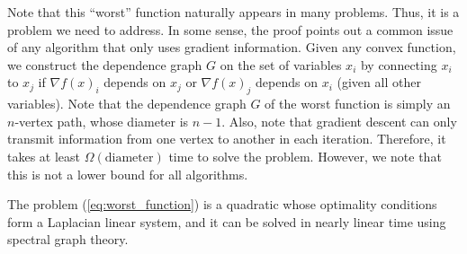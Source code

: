 Note that this ``worst'' function naturally appears in many problems.
Thus, it is a problem we need to address. In some sense, the proof
points out a common issue of any algorithm that only uses gradient
information. Given any convex function, we construct the dependence
graph $G$ on the set of variables $x_{i}$ by connecting $x_{i}$
to $x_{j}$ if $\nabla f(x)_{i}$ depends on $x_{j}$ or $\nabla f(x)_{j}$
depends on $x_{i}$ (given all other variables). Note that the dependence
graph $G$ of the worst function is simply an $n$-vertex path, whose
diameter is $n-1$. Also, note that gradient descent can only transmit
information from one vertex to another in each iteration. Therefore,
it takes at least $\Omega(\mathrm{diameter})$ time to solve the problem.
However, we note that this is not a lower bound for all algorithms.

The problem (\ref{eq:worst_function}) is a quadratic whose optimality
conditions form a Laplacian linear system, and it can be solved in
nearly linear time using spectral graph theory. %

